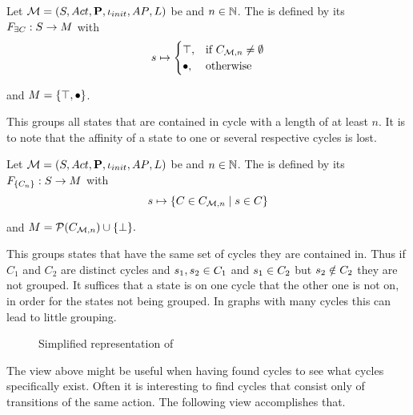 \documentclass[preview]{standalone}
\begin{document}
\begin{definition}
	Let ${{{\mathcal{M}}}} = {{({S}, {Act}, {\textbf{P}}, {\iota_{init}}, {AP}, {L})}}$ be \achgphN and $n \in {\mathbb{N}}$. The \viewN \viewhascycle is defined by its \grpfctN ${{F_{\exists{C}}}} : {S} \to {\ensuremath{{M}}}$ with
	\[
	\state \mapsto
	\begin{cases}
			\group, &\text{if } \cycleset \neq \emptyset \\
			\remelem, &\text{otherwise}
		\end{cases}
	\]
	
	and ${{M}} = \{{\top}, {\bullet}\}$.
\end{definition}

This \viewN groups all states that are contained in cycle with a length of at least $n$. It is to note that the affinity of a state to one or several respective cycles is lost.


\begin{definition}
	Let ${{{\mathcal{M}}}} = {{({S}, {Act}, {\textbf{P}}, {\iota_{init}}, {AP}, {L})}}$ be \achgphN and $n \in {\mathbb{N}}$. The \viewN \viewexactcycle is defined by its \grpfctN ${{F_{{\{{C}_{{n}}\}}}}} : {S} \to {\ensuremath{{M}}}$ with
	\[
	\state \mapsto \{\cycle \in \cycleset \mid \state \in \cycle\}
	\]
	
	and ${{M}} = {\mathcal{P}({{C}_{{{\mathcal{M}}}, n}})}\cup {\{\bot\}}.$
	\label{def:exactcycleview}
\end{definition}

This \viewN groups states that have the same set of cycles they are contained in. Thus if $C_1$ and $C_2$ are distinct cycles and ${s}_1, {s}_2 \in {C}_1$ and ${s}_1 \in {C}_2$ but ${s}_2 \notin {C}_2$ they are not grouped. It suffices that a state is on one cycle that the other one is not on, in order for the states not being grouped. In graphs with many cycles this can lead to little grouping.


\begin{figure}[h]
	\centering
				
	\caption{Simplified representation of \mdp}
	\label{fig:cyclesBefore}  
\end{figure}





The view above might be useful when having found cycles to see what cycles specifically exist. Often it is interesting to find cycles that consist only of transitions of the same action. The following view accomplishes that.
\end{document}
